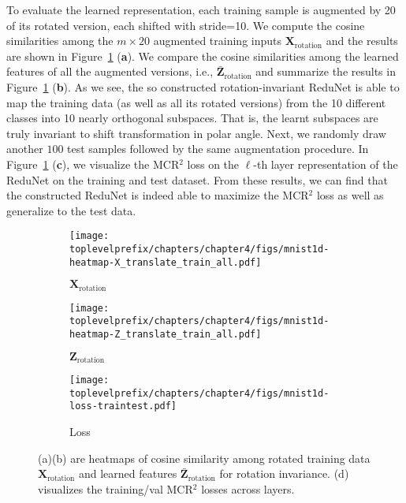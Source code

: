 \documentclass[../../book-main.tex]{subfiles}
\begin{document}
\begin{example}
To evaluate the learned representation, each training sample is augmented by 20 of its rotated version, each shifted with stride=10. We compute the cosine similarities among the $m \times 20$ augmented training inputs $\bm{X}_{\text{rotation}}$ and the results are shown in Figure~\ref{fig:redu-invariant-1d-mnist-diagram} (\textbf{a}). 
We compare the cosine similarities among the learned features of all the augmented versions, i.e., $\bar{\bm{Z}}_{\text{rotation}}$ and summarize the results in  Figure~\ref{fig:redu-invariant-1d-mnist-diagram} (\textbf{b}). 
As we see, the so constructed rotation-invariant ReduNet is able to  map the training data (as well as all its rotated versions) from the 10 different classes into 10 nearly orthogonal subspaces. That is, the learnt subspaces are truly invariant to shift transformation in polar angle.  Next, we randomly draw another $100$ test samples followed by the same augmentation procedure. 
In Figure~\ref{fig:redu-invariant-1d-mnist-diagram} (\textbf{c}), we visualize the MCR$^{2}$ loss on the  $\ell$-th layer representation of the ReduNet on the training and test dataset. From these results, we can find that the constructed ReduNet is indeed able to maximize the MCR$^{2}$ loss as well as generalize to the test data.



\begin{figure}[t]
    \begin{subfigure}[t]{0.3\textwidth}
        \centering
        \texttt{[image: \\toplevelprefix/chapters/chapter4/figs/mnist1d-heatmap-X\_translate\_train\_all.pdf]}
        \caption{$\bm{X}_{\text{rotation}}$}
    \end{subfigure}
    \hfill
    \begin{subfigure}[t]{0.3\textwidth}
        \centering
        \texttt{[image: \\toplevelprefix/chapters/chapter4/figs/mnist1d-heatmap-Z\_translate\_train\_all.pdf]}
        \caption{$\bm{Z}_{\text{rotation}}$}
    \end{subfigure}
    \hfill
    \begin{subfigure}[t]{0.32\textwidth}
        \centering
        \texttt{[image: \\toplevelprefix/chapters/chapter4/figs/mnist1d-loss-traintest.pdf]}
        \caption{Loss}
    \end{subfigure}
    \caption{\small (a)(b) are heatmaps of cosine similarity among rotated training data $\bm{X}_{\text{rotation}}$ and learned features $\bar{\bm{Z}}_{\text{rotation}}$ for rotation invariance. (d) visualizes the training/val MCR$^2$ losses across layers.}
    \label{fig:redu-invariant-1d-mnist-diagram}
\end{figure}

\end{example}
\end{document}

